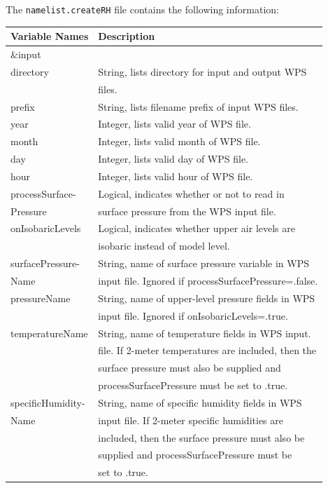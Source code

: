\newpage
The \texttt{namelist.createRH} file contains the following information:

\begin{tabular}{|l|l|} \hline
Variable Names & Description \\ \hline
\&input          & \\ \hline
directory & String, lists directory for input and output WPS \\
& files. \\ \hline
prefix & String, lists filename prefix of input WPS files. \\ \hline
year & Integer, lists valid year of WPS file. \\ \hline
month & Integer, lists valid month of WPS file. \\ \hline
day & Integer, lists valid day of WPS file. \\ \hline
hour & Integer, lists valid hour of WPS file. \\ \hline
processSurface- & Logical, indicates whether or not to read in \\
Pressure  & surface pressure from the WPS input file. \\ \hline
onIsobaricLevels & Logical, indicates whether upper air levels are \\
 & isobaric instead of model level. \\ \hline
surfacePressure- & String, name of surface pressure variable in WPS \\
 Name & input file. Ignored if processSurfacePressure=.false. \\ \hline
pressureName & String, name of upper-level pressure fields in WPS \\
 & input file. Ignored if onIsobaricLevels=.true. \\ \hline
temperatureName & String, name of temperature fields in WPS input. \\
 & file. If 2-meter temperatures are included, then the  \\
 & surface pressure must also be supplied and \\
 & processSurfacePressure must be set to .true. \\ \hline
specificHumidity- & String, name of specific humidity fields in WPS \\
Name & input file. If 2-meter specific humidities are \\
 & included, then the surface pressure must also be \\
 & supplied and processSurfacePressure must be \\
 & set to .true. \\ \hline
\end{tabular} \\

